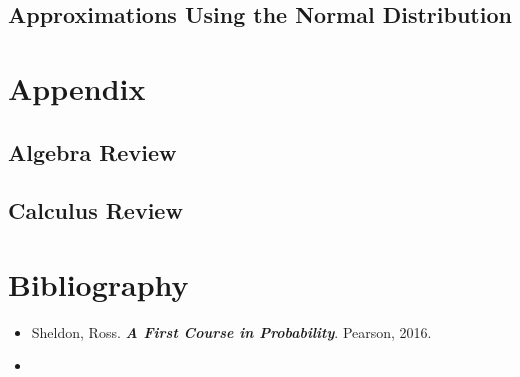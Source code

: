 \documentclass[
  12pt,
]{krantzNoCorner}
\providecommand{\tightlist}{%
  \setlength{\itemsep}{0pt}\setlength{\parskip}{0pt}}
\begin{document}
\hypertarget{approximations-using-the-normal-distribution}{%
\section{Approximations Using the Normal Distribution}\label{approximations-using-the-normal-distribution}}

\hypertarget{appendix}{%
\chapter*{Appendix}\label{appendix}}


\hypertarget{algebra-review}{%
\section*{Algebra Review}\label{algebra-review}}


\hypertarget{calculus-review}{%
\section*{Calculus Review}\label{calculus-review}}


\hypertarget{bibliography}{%
\chapter*{Bibliography}\label{bibliography}}


\begin{itemize}
\tightlist
\item
  Sheldon, Ross. \textbf{\emph{A First Course in Probability}}. Pearson, 2016.
\item
\end{itemize}
\end{document}
